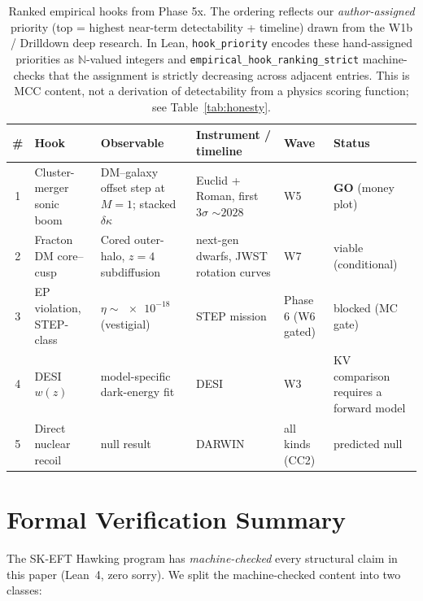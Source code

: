 \documentclass[aps,prd,twocolumn,showpacs,superscriptaddress,nofootinbib]{revtex4-2}
\begin{document}
\begin{table}[ht]
\centering
\caption{\label{tab:hooks}Ranked empirical hooks from Phase 5x. The
ordering reflects our \emph{author-assigned} priority (top = highest
near-term detectability + timeline) drawn from the W1b / Drilldown
deep research. In Lean, \texttt{hook\_priority} encodes these
hand-assigned priorities as $\mathbb{N}$-valued integers and
\texttt{empirical\_hook\_ranking\_strict} machine-checks that the
assignment is strictly decreasing across adjacent entries. This is
MCC content, not a derivation of detectability from a physics
scoring function; see Table~\ref{tab:honesty}.}
\begin{tabular}{@{}clllll@{}}
\toprule
\# & Hook & Observable & Instrument / timeline & Wave & Status \\
\midrule
1 & Cluster-merger sonic boom & DM--galaxy offset step at $M{=}1$;
  stacked $\delta\kappa$ & Euclid + Roman, first $3\sigma$ ${\sim}2028$ &
  W5 & \textbf{GO} (money plot) \\
2 & Fracton DM core--cusp & Cored outer-halo, $z{=}4$ subdiffusion &
  next-gen dwarfs, JWST rotation curves & W7 & viable (conditional) \\
3 & EP violation, STEP-class & $\eta \sim \num{e-18}$ (vestigial) &
  STEP mission & Phase 6 (W6 gated) & blocked (MC gate) \\
4 & DESI $w(z)$ & model-specific dark-energy fit & DESI & W3 &
  KV comparison requires a forward model \\
5 & Direct nuclear recoil & null result & DARWIN & all kinds (CC2) &
  predicted null \\
\bottomrule
\end{tabular}
\end{table}

\section{Formal Verification Summary}
\label{sec:formal-verification}

The SK-EFT Hawking program has \emph{machine-checked} every structural
claim in this paper (Lean~4, zero sorry). We split the machine-checked
content into two classes:
\end{document}

